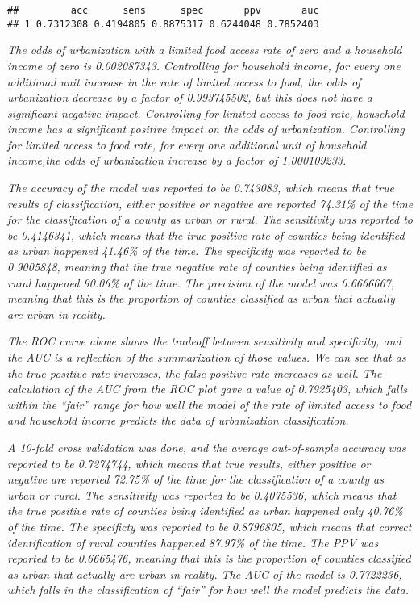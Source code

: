 \documentclass[]{article}
\begin{document}
\begin{verbatim}
##         acc      sens      spec       ppv       auc
## 1 0.7312308 0.4194805 0.8875317 0.6244048 0.7852403
\end{verbatim}

\emph{The odds of urbanization with a limited food access rate of zero
and a household income of zero is 0.002087343. Controlling for household
income, for every one additional unit increase in the rate of limited
access to food, the odds of urbanization decrease by a factor of
0.993745502, but this does not have a significant negative impact.
Controlling for limited access to food rate, household income has a
significant positive impact on the odds of urbanization. Controlling for
limited access to food rate, for every one additional unit of household
income,the odds of urbanization increase by a factor of 1.000109233.}

\emph{The accuracy of the model was reported to be 0.743083, which means
that true results of classification, either positive or negative are
reported 74.31\% of the time for the classification of a county as urban
or rural. The sensitivity was reported to be 0.4146341, which means that
the true positive rate of counties being identified as urban happened
41.46\% of the time. The specificity was reported to be 0.9005848,
meaning that the true negative rate of counties being identified as
rural happened 90.06\% of the time. The precision of the model was
0.6666667, meaning that this is the proportion of counties classified as
urban that actually are urban in reality.}

\emph{The ROC curve above shows the tradeoff between sensitivity and
specificity, and the AUC is a reflection of the summarization of those
values. We can see that as the true positive rate increases, the false
positive rate increases as well. The calculation of the AUC from the ROC
plot gave a value of 0.7925403, which falls within the ``fair'' range
for how well the model of the rate of limited access to food and
household income predicts the data of urbanization classification.}

\emph{A 10-fold cross validation was done, and the average out-of-sample
accuracy was reported to be 0.7274744, which means that true results,
either positive or negative are reported 72.75\% of the time for the
classification of a county as urban or rural. The sensitivity was
reported to be 0.4075536, which means that the true positive rate of
counties being identified as urban happened only 40.76\% of the time.
The specificty was reported to be 0.8796805, which means that correct
identification of rural counties happened 87.97\% of the time. The PPV
was reported to be 0.6665476, meaning that this is the proportion of
counties classified as urban that actually are urban in reality. The AUC
of the model is 0.7722236, which falls in the classification of ``fair''
for how well the model predicts the data.}
\end{document}
